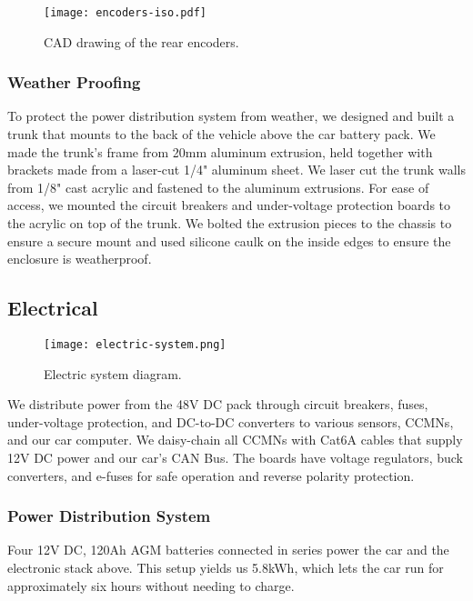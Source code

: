 \begin{figure}[ht!]
  \centering
  \texttt{[image: encoders-iso.pdf]}
  \caption{CAD drawing of the rear encoders.}
\end{figure}

\subsubsection{Weather Proofing}

To protect the power distribution system from weather, we designed and
built a trunk that mounts to the back of the vehicle above the car
battery pack. We made the trunk's frame from 20mm aluminum extrusion,
held together with brackets made from a laser-cut 1/4" aluminum sheet.
We laser cut the trunk walls from 1/8" cast acrylic and fastened to the
aluminum extrusions. For ease of access, we mounted the circuit
breakers and under-voltage protection boards to the acrylic on top of
the trunk. We bolted the extrusion pieces to the chassis to ensure a
secure mount and used silicone caulk on the inside edges to ensure the
enclosure is weatherproof.

\newpage

\subsection{Electrical}

\begin{figure}[ht!]
  \centering
  \texttt{[image: electric-system.png]}
  \caption{Electric system diagram.}
\end{figure}

We distribute power from the 48V DC pack through circuit breakers,
fuses, under-voltage protection, and DC-to-DC converters to various
sensors, CCMNs, and our car computer. We daisy-chain all CCMNs with
Cat6A cables that supply 12V DC power and our car's CAN Bus. The boards
have voltage regulators, buck converters, and e-fuses for safe
operation and reverse polarity protection.

\subsubsection{Power Distribution System}

Four 12V DC, 120Ah AGM batteries connected in series power the car and
the electronic stack above. This setup yields us 5.8kWh, which lets the
car run for approximately six hours without needing to charge.

